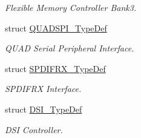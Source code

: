 \begin{DoxyCompactItemize}
\begin{DoxyCompactList}\small\item\em Flexible Memory Controller Bank3. \end{DoxyCompactList}\item 
struct \hyperlink{struct_q_u_a_d_s_p_i___type_def}{Q\+U\+A\+D\+S\+P\+I\+\_\+\+Type\+Def}
\begin{DoxyCompactList}\small\item\em Q\+U\+AD Serial Peripheral Interface. \end{DoxyCompactList}\item 
struct \hyperlink{struct_s_p_d_i_f_r_x___type_def}{S\+P\+D\+I\+F\+R\+X\+\_\+\+Type\+Def}
\begin{DoxyCompactList}\small\item\em S\+P\+D\+I\+F\+RX Interface. \end{DoxyCompactList}\item 
struct \hyperlink{struct_d_s_i___type_def}{D\+S\+I\+\_\+\+Type\+Def}
\begin{DoxyCompactList}\small\item\em D\+SI Controller. \end{DoxyCompactList}\end{DoxyCompactItemize}
